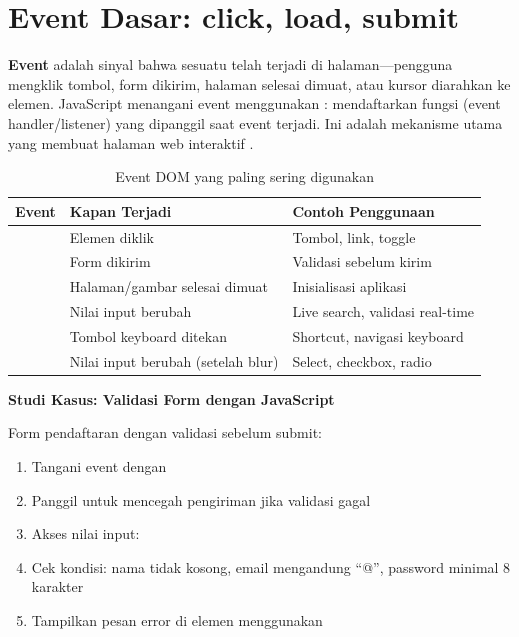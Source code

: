 \section{Event Dasar: click, load, submit}

\textbf{Event} adalah sinyal bahwa sesuatu telah terjadi di halaman---pengguna mengklik tombol, form dikirim, halaman selesai dimuat, atau kursor diarahkan ke elemen. JavaScript menangani event menggunakan : mendaftarkan fungsi (event handler/listener) yang dipanggil saat event terjadi. Ini adalah mekanisme utama yang membuat halaman web interaktif \cite{jsInfo}.

\begin{table}[htbp]
\centering
\begin{tabular}{|P{2.5cm}|P{3.5cm}|P{6cm}|}
\hline
\textbf{Event} & \textbf{Kapan Terjadi} & \textbf{Contoh Penggunaan} \\
\hline
{} & Elemen diklik & Tombol, link, toggle \\
\hline
{} & Form dikirim & Validasi sebelum kirim \\
\hline
{} & Halaman/gambar selesai dimuat & Inisialisasi aplikasi \\
\hline
{} & Nilai input berubah & Live search, validasi real-time \\
\hline
{} & Tombol keyboard ditekan & Shortcut, navigasi keyboard \\
\hline
{} & Nilai input berubah (setelah blur) & Select, checkbox, radio \\
\hline
\end{tabular}
\caption{Event DOM yang paling sering digunakan}
\end{table}

\begin{contoh}
\textbf{Studi Kasus: Validasi Form dengan JavaScript}

Form pendaftaran dengan validasi sebelum submit:
\begin{enumerate}
  \item Tangani event  dengan 
  \item Panggil  untuk mencegah pengiriman jika validasi gagal
  \item Akses nilai input: 
  \item Cek kondisi: nama tidak kosong, email mengandung ``@'', password minimal 8 karakter
  \item Tampilkan pesan error di elemen  menggunakan 
\end{enumerate}
\end{contoh}

